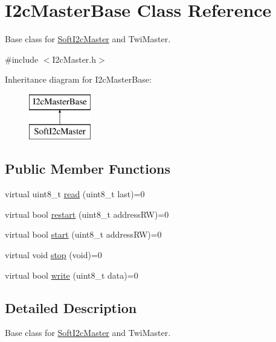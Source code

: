 \hypertarget{class_i2c_master_base}{}\section{I2c\+Master\+Base Class Reference}
\label{class_i2c_master_base}


Base class for \hyperlink{class_soft_i2c_master}{Soft\+I2c\+Master} and Twi\+Master.  




{\ttfamily \#include $<$I2c\+Master.\+h$>$}

Inheritance diagram for I2c\+Master\+Base\+:\begin{figure}[H]
\begin{center}
\leavevmode
\includegraphics[height=2.000000cm]{class_i2c_master_base}
\end{center}
\end{figure}
\subsection*{Public Member Functions}
\begin{DoxyCompactItemize}
\item 
virtual uint8\+\_\+t \hyperlink{class_i2c_master_base_ab0642665deb11295592d3e46c8baaefa}{read} (uint8\+\_\+t last)=0
\item 
virtual bool \hyperlink{class_i2c_master_base_a3ccb7274e45f8842f5748d5ae9931dd0}{restart} (uint8\+\_\+t address\+R\+W)=0
\item 
virtual bool \hyperlink{class_i2c_master_base_adf5e98b79dec8f7b5a43c2ec8f2f9f7a}{start} (uint8\+\_\+t address\+R\+W)=0
\item 
virtual void \hyperlink{class_i2c_master_base_a0c4f54aea3b04ed699efc0fa684712c7}{stop} (void)=0
\item 
virtual bool \hyperlink{class_i2c_master_base_aee4d48385a72b48a0a452ecfc2cd7fc0}{write} (uint8\+\_\+t data)=0
\end{DoxyCompactItemize}


\subsection{Detailed Description}
Base class for \hyperlink{class_soft_i2c_master}{Soft\+I2c\+Master} and Twi\+Master. 

